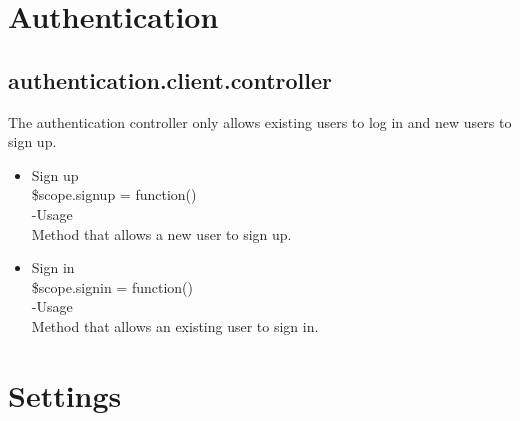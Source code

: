 \documentclass[a4paper,12pt]{article}
\begin{document}
\section{Authentication}
\subsection{authentication.client.controller}
The authentication controller only allows existing users to log in and new users to sign up.
 \begin{itemize}
 \item Sign up \\
 \$scope.signup = function()\\
 -Usage\\
 Method that allows a new user to sign up.
 \item Sign in\\
  \$scope.signin = function()\\
 -Usage\\
 Method that allows an existing user to sign in.
 \end{itemize}
 
 \section{Settings}
\end{document}

